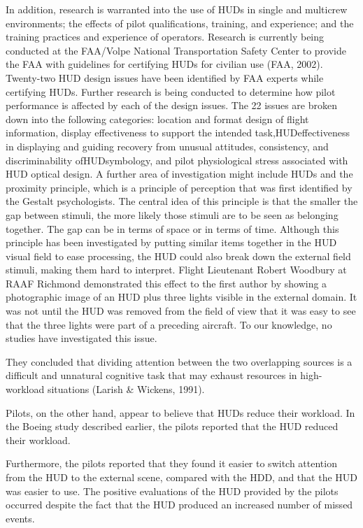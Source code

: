 \documentclass[utf8,bachelor,manualbib]{gradu3}
\begin{document}
In addition, research is
warranted into the use of HUDs in single and multicrew environments; the effects
of pilot qualifications, training, and experience; and the training practices
and experience of operators.
Research is currently being conducted at the FAA/Volpe National Transportation
Safety Center to provide the FAA with guidelines for certifying HUDs for civilian
use (FAA, 2002). Twenty-two HUD design issues have been identified by
FAA experts while certifying HUDs. Further research is being conducted to determine
how pilot performance is affected by each of the design issues. The 22 issues
are broken down into the following categories: location and format design of flight
information, display effectiveness to support the intended task,HUDeffectiveness
in displaying and guiding recovery from unusual attitudes, consistency, and
discriminability ofHUDsymbology, and pilot physiological stress associated with
HUD optical design.
A further area of investigation might include HUDs and the proximity principle,
which is a principle of perception that was first identified by the Gestalt psychologists.
The central idea of this principle is that the smaller the gap between
stimuli, the more likely those stimuli are to be seen as belonging together. The gap
can be in terms of space or in terms of time. Although this principle has been investigated
by putting similar items together in the HUD visual field to ease processing,
the HUD could also break down the external field stimuli, making them hard
to interpret. Flight Lieutenant Robert Woodbury at RAAF Richmond demonstrated
this effect to the first author by showing a photographic image of an HUD
plus three lights visible in the external domain. It was not until the HUD was removed from the field of view that it was easy to see that the three lights were part of
a preceding aircraft. To our knowledge, no studies have investigated this issue. \citep{crawford2006}


They concluded that dividing attention between the two overlapping sources is a
difficult and unnatural cognitive task that may exhaust resources in
high-workload situations (Larish \& Wickens, 1991).

Pilots, on the other hand, appear to believe that HUDs reduce their workload.
In the Boeing study described earlier, the pilots reported that the HUD reduced
their workload.

Furthermore, the pilots reported that they found it easier to
switch attention from the HUD to the external scene, compared with the HDD,
and that the HUD was easier to use. The positive evaluations of the HUD provided
by the pilots occurred despite the fact that the HUD produced an increased
number of missed events.
\end{document}
